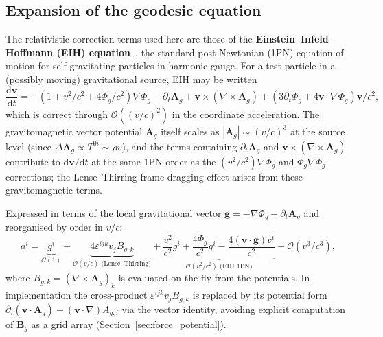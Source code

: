 \documentclass[11pt,a4paper]{article}
\newcommand{\vv}[1]{\mathbf{#1}}
\newcommand{\Phig}{\Phi_g}
\newcommand{\Ag}{\vv{A}_g}
\newcommand{\order}[1]{\mathcal{O}(#1)}
\newcommand{\dd}{\mathrm{d}}
\begin{document}
\subsection{Expansion of the geodesic equation}
\label{sec:geodesic_expansion}

The relativistic correction terms used here are those of the
\textbf{Einstein--Infeld--Hoffmann (EIH) equation}~\cite{Will1993,AliHaimoud2019}, the standard
post-Newtonian (1PN) equation of motion for self-gravitating particles
in harmonic gauge.  For a test particle in a (possibly moving) gravitational
source, EIH may be written
\begin{equation}
\label{eq:eih_full}
  \frac{\dd\vv{v}}{\dd t}
  = -(1 + v^2/c^2 + 4\Phig/c^2)\nabla\Phig
    - \partial_t\Ag
    + \vv{v}\times(\nabla\times\Ag)
    + (3\partial_t\Phig + 4\vv{v}\cdot\nabla\Phig)\vv{v}/c^2,
\end{equation}
which is correct through $\order{(v/c)^2}$ in the coordinate acceleration.
The gravitomagnetic vector potential $\Ag$ itself scales as
$|\Ag| \sim (v/c)^3$ at the source level (since
$\Delta\Ag \propto T^{0i} \sim \rho v$), and the terms containing
$\partial_t\Ag$ and $\vv{v}\times(\nabla\times\Ag)$ contribute to
$\dd\vv{v}/\dd t$ at the same 1PN order as the $(v^2/c^2)\nabla\Phig$ and
$\Phig\nabla\Phig$ corrections; the Lense--Thirring frame-dragging effect
arises from these gravitomagnetic terms.

Expressed in terms of the local gravitational vector
$\vv{g} = -\nabla\Phig - \partial_t\Ag$ and reorganised by order in $v/c$:
\begin{equation}
\label{eq:geodesic_expansion}
  a^i = \underbrace{g^i}_{\order{1}}
      + \underbrace{4\varepsilon^{ijk}v_j B_{g,k}}_{\order{v/c}\text{ (Lense--Thirring)}}
      + \underbrace{\frac{v^2}{c^2}g^i + \frac{4\Phig}{c^2}g^i - \frac{4(\vv{v}\cdot\vv{g})v^i}{c^2}}_{\order{v^2/c^2}\text{ (EIH 1PN)}}
      + \order{v^3/c^3},
\end{equation}
where $B_{g,k} = (\nabla\times\Ag)_k$ is evaluated on-the-fly from the
potentials.  In implementation the cross-product $\varepsilon^{ijk}v_j B_{g,k}$
is replaced by its potential form $\partial_i(\vv{v}\cdot\Ag) - (\vv{v}\cdot\nabla)A_{g,i}$
via the vector identity, avoiding explicit computation of $\vv{B}_g$ as a
grid array (Section~\ref{sec:force_potential}).
\end{document}
